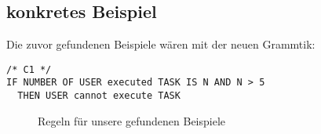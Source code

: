 \subsection{konkretes Beispiel}
Die zuvor gefundenen Beispiele wären mit der neuen Grammtik:\\
\begin{verbatim}
/* C1 */
IF NUMBER OF USER executed TASK IS N AND N > 5
  THEN USER cannot execute TASK
\end{verbatim}
\begin{figure}[!h]
\caption{Regeln für unsere gefundenen Beispiele}
\label{fig:resultrulefile}
\end{figure}
